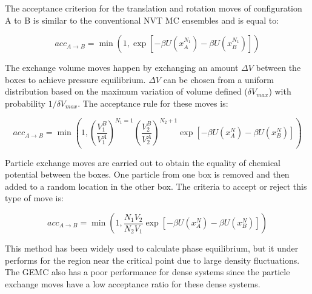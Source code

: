 The acceptance criterion for the translation and rotation moves of configuration A	to B is similar to the conventional NVT MC ensembles and is equal to:

\begin{equation}
acc_{A \rightarrow B} = \min(1,\exp[-\beta U(x_{A}^{N_{1}}) -\beta U(x_{B}^{N_{1}})])
\label{eqn:drprob}
\end{equation} 

The exchange volume moves happen by exchanging an amount $\Delta V$ between the boxes to achieve pressure equilibrium. $\Delta V$ can be chosen from a uniform distribution based on the maximum variation of volume defined ($\delta V_{max}$) with probability $1/\delta V_{max}$. The acceptance rule for these moves is: 

\begin{equation}
acc_{A \rightarrow B} = \min \left(1, \left(\dfrac{V_{1}^{B}}{V_{1}^{A}} \right)^{N_{1}=1} \left( \dfrac{V_{2}^{B}}{V_{2}^{A}} \right)^{N_{2}+1} \exp[-\beta U(x_{A}^{N}) -\beta U(x_{B}^{N})] \right)
\label{vprob}
\end{equation}

Particle exchange moves are carried out to obtain the equality of chemical potential between the boxes. One particle from one box is removed and then added to a random location in the other box. The criteria to accept or reject this type of move is:

\begin{equation}
acc_{A \rightarrow B} = \min \left( 1, \dfrac{N_{1}V_{2}}{N_{2}V_{1}}  \exp[-\beta U(x_{A}^{N}) -\beta U(x_{B}^{N})] \right)
\label{moleprob}
\end{equation}

This method has been widely used to calculate phase equilibrium, but it under performs for the region near the critical point due to large density fluctuations. The GEMC also has a poor performance for dense systems since the particle exchange moves have a low acceptance ratio for these dense systems.  





